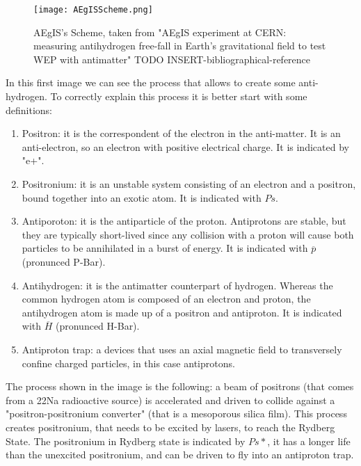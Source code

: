 \begin{figure}[H]
\centering
\texttt{[image: AEgISScheme.png]} 
\caption{AEgIS's Scheme, taken from "AEgIS experiment at CERN: measuring antihydrogen free-fall in Earth’s gravitational field to test WEP with antimatter" TODO INSERT-bibliographical-reference}
\end{figure}

In this first image we can see the process that allows to create some anti-hydrogen. To correctly explain this process it is better start with some definitions:


\begin{enumerate}

\item Positron: it is the correspondent of the electron in the anti-matter. It is an anti-electron, so an electron with positive electrical charge. It is indicated by "e+".

\item Positronium: it is an unstable system consisting of an electron and a positron, bound together into an exotic atom. It is indicated with $ {Ps} $.

\item Antiporoton: it is the antiparticle of the proton. Antiprotons are stable, but they are typically short-lived since any collision with a proton will cause both particles to be annihilated in a burst of energy. It is indicated with $ \overline{p} $ (pronunced P-Bar).

\item Antihydrogen: it is the antimatter counterpart of hydrogen. Whereas the common hydrogen atom is composed of an electron and proton, the antihydrogen atom is made up of a positron and antiproton. It is indicated with $ \overline{H} $ (pronunced H-Bar).


\item Antiproton trap: a devices that uses an axial magnetic field to transversely confine charged particles, in this case antiprotons.


\end{enumerate}

The process shown in the image is the following: a beam of positrons (that comes from a 22Na radioactive source) is accelerated and driven to collide against a "positron-positronium converter" (that is a mesoporous silica film). This process creates positronium, that needs to be excited by lasers, to reach the Rydberg State. The positronium in Rydberg state is indicated by $ {Ps*} $, it has a longer life than the unexcited positronium, and can be driven to fly into an antiproton trap.

